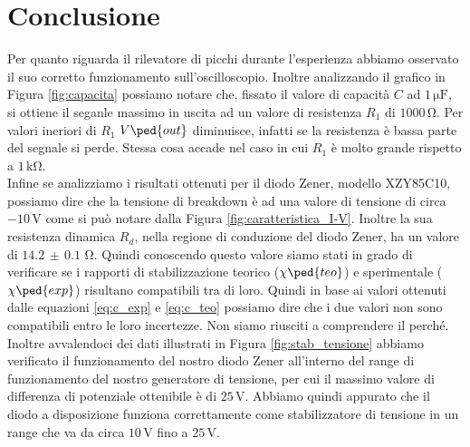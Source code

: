 \section*{Conclusione}

Per quanto riguarda il rilevatore di picchi durante l'esperienza abbiamo osservato il suo corretto funzionamento sull'oscilloscopio. Inoltre analizzando il grafico in Figura \ref{fig:capacita} possiamo notare che, fissato il valore di capacità $C$ ad $1\,\si{\micro\farad}$, si ottiene il seganle massimo in uscita ad un valore di resistenza $R_1$ di $1000\,\si{\ohm}$. Per valori ineriori di $R_1$ $V\ped{out}$ diminuisce, infatti se la resistenza è bassa parte del segnale si perde. Stessa cosa accade nel caso in cui $R_1$ è molto grande rispetto a $1\,\si{\kilo\ohm}$. \\

Infine se analizziamo i risultati ottenuti per il diodo Zener, modello XZY85C10, possiamo dire che la tensione di breakdown è ad una valore di tensione di circa $-10\,\si{\volt}$ come si può notare dalla Figura \ref{fig:caratteristica_I-V}. Inoltre la sua resistenza dinamica $R_d$, nella regione di conduzione del diodo Zener, ha un valore di $14.2\,\pm\,0.1\,\,\si{\ohm}$. Quindi conoscendo questo valore siamo stati in grado di verificare se i rapporti di stabilizzazione teorico ($\chi\ped{teo}$) e sperimentale ($\chi\ped{exp}$) risultano compatibili tra di loro. Quindi in base ai valori ottenuti dalle equazioni \ref{eq:c_exp} e \ref{eq:c_teo} possiamo dire che i due valori non sono compatibili entro le loro incertezze. Non siamo riusciti a comprendere
il perché.
Inoltre avvalendoci dei dati illustrati in Figura \ref{fig:stab_tensione} abbiamo verificato il funzionamento del nostro diodo Zener all'interno del range di funzionamento del nostro generatore di tensione, per cui il massimo valore di differenza di potenziale ottenibile è di $25\,\si{\volt}$. Abbiamo quindi appurato che il diodo a disposizione funziona correttamente come stabilizzatore di tensione in un range che va da circa $10\,\si{\volt}$ fino a $25\,\si{\volt}$.

